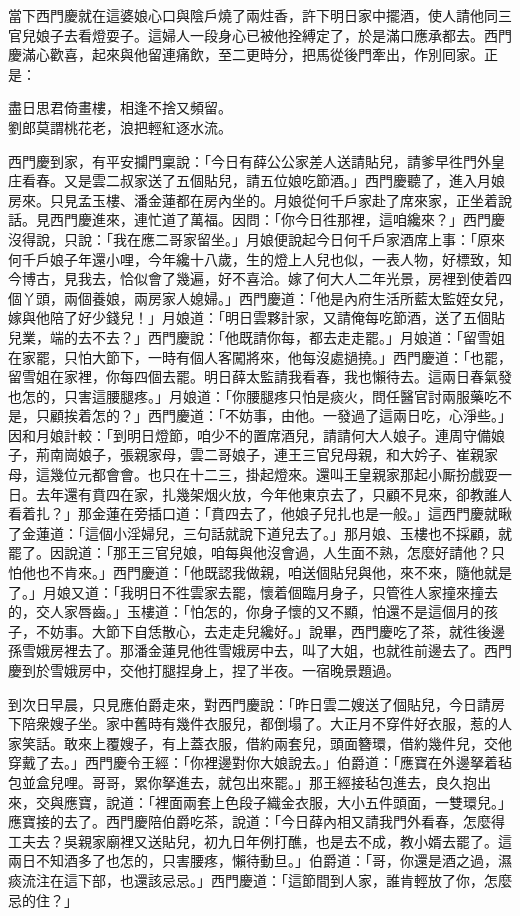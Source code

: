 當下西門慶就在這婆娘心口與陰戶燒了兩炷香，許下明日家中擺酒，使人請他同三官兒娘子去看燈耍子。這婦人一段身心已被他拴縛定了，於是滿口應承都去。西門慶滿心歡喜，起來與他留連痛飲，至二更時分，把馬從後門牽出，作別囘家。正是：

\begin{myquote}
盡日思君倚畫樓，相逢不捨又頻留。\\劉郎莫謂桃花老，浪把輕紅逐水流。
\end{myquote}

西門慶到家，有平安攔門稟說：「今日有薛公公家差人送請貼兒，請爹早徃門外皇庄看春。又是雲二叔家送了五個貼兒，請五位娘吃節酒。」西門慶聽了，進入月娘房來。只見孟玉樓、潘金蓮都在房內坐的。月娘從何千戶家赴了席來家，正坐着說話。見西門慶進來，連忙道了萬福。因問：「你今日徃那裡，這咱纔來？」西門慶沒得說，只說：「我在應二哥家留坐。」月娘便說起今日何千戶家酒席上事：「原來何千戶娘子年還小哩，今年纔十八歲，生的燈上人兒也似，一表人物，好標致，知今博古，見我去，恰似會了幾遍，好不喜洽。嫁了何大人二年光景，房裡到使着四個丫頭，兩個養娘，兩房家人媳婦。」西門慶道：「他是內府生活所藍太監姪女兒，嫁與他陪了好少錢兒！」月娘道：「明日雲夥計家，又請俺每吃節酒，送了五個貼兒業，端的去不去？」西門慶說：「他既請你每，都去走走罷。」月娘道：「留雪姐在家罷，只怕大節下，一時有個人客闖將來，他每沒處撾撓。」西門慶道：「也罷，留雪姐在家裡，你每四個去罷。明日薛太監請我看春，我也懶待去。這兩日春氣發也怎的，只害這腰腿疼。」月娘道：「你腰腿疼只怕是痰火，問任醫官討兩服藥吃不是，只顧挨着怎的？」西門慶道：「不妨事，由他。一發過了這兩日吃，心淨些。」因和月娘計較：「到明日燈節，咱少不的置席酒兒，請請何大人娘子。連周守備娘子，荊南崗娘子，張親家母，雲二哥娘子，連王三官兒母親，和大妗子、崔親家母，這幾位元都會會。也只在十二三，掛起燈來。還叫王皇親家那起小厮扮戲耍一日。去年還有賁四在家，扎幾架烟火放，今年他東京去了，只顧不見來，卻教誰人看着扎？」那金蓮在旁插口道：「賁四去了，他娘子兒扎也是一般。」{}這西門慶就瞅了金蓮道：「這個小淫婦兒，三句話就說下道兒去了。」那月娘、玉樓也不採顧，就罷了。因說道：「那王三官兒娘，咱每與他沒會過，人生面不熟，怎麼好請他？只怕他也不肯來。」西門慶道：「他既認我做親，咱送個貼兒與他，來不來，隨他就是了。」月娘又道：「我明日不徃雲家去罷，懷着個臨月身子，只管徃人家撞來撞去的，交人家唇齒。」玉樓道：「怕怎的，你身子懷的又不顯，怕還不是這個月的孩子，不妨事。大節下自恁散心，去走走兒纔好。」說畢，西門慶吃了茶，就徃後邊孫雪娥房裡去了。那潘金蓮見他徃雪娥房中去，叫了大姐，也就徃前邊去了。西門慶到於雪娥房中，交他打腿捏身上，捏了半夜。{}一宿晚景題過。

到次日早晨，只見應伯爵走來，對西門慶說：「昨日雲二嫂送了個貼兒，今日請房下陪衆嫂子坐。家中舊時有幾件衣服兒，都倒塌了。大正月不穿件好衣服，惹的人家笑話。敢來上覆嫂子，有上蓋衣服，借約兩套兒，頭面簪環，借約幾件兒，交他穿戴了去。」西門慶令王經：「你裡邊對你大娘說去。」伯爵道：「應寶在外邊拏着毡包並盒兒哩。哥哥，累你拏進去，就包出來罷。」那王經接毡包進去，良久抱出來，交與應寶，說道：「裡面兩套上色段子織金衣服，大小五件頭面，一雙環兒。」{}應寶接的去了。西門慶陪伯爵吃茶，說道：「今日薛內相又請我門外看春，怎麼得工夫去？吳親家廟裡又送貼兒，初九日年例打醮，也是去不成，教小婿去罷了。這兩日不知酒多了也怎的，只害腰疼，懶待動旦。」伯爵道：「哥，你還是酒之過，濕痰流注在這下部，也還該忌忌。」西門慶道：「這節間到人家，誰肯輕放了你，怎麼忌的住？」

